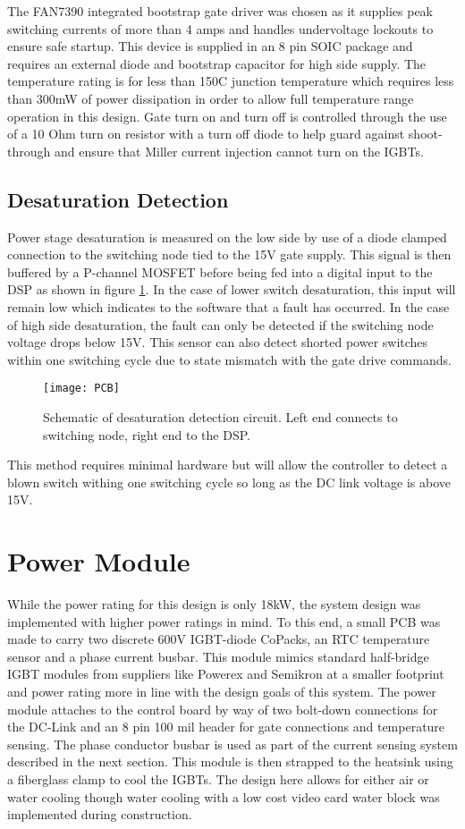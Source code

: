 The FAN7390 integrated bootstrap gate driver was chosen as it supplies peak
switching currents of more than 4 amps and handles undervoltage lockouts to
ensure safe startup.
This device is supplied in an 8 pin SOIC package and requires an external
diode and bootstrap capacitor for high side supply.
The temperature rating is for less than 150C junction temperature which
requires less than 300mW of power dissipation in order to allow full
temperature range operation in this design.
Gate turn on and turn off is controlled through the use of a 10 Ohm turn on
resistor with a turn off diode to help guard against shoot-through and ensure
that Miller current injection cannot turn on the IGBTs.

\subsection{Desaturation Detection}
Power stage desaturation is measured on the low side by use of a diode clamped
connection to the switching node tied to the 15V gate supply.
This signal is then buffered by a P-channel MOSFET before being fed into a
digital input to the DSP as shown in figure \ref{figDesat}.
In the case of lower switch desaturation, this input will remain low which
indicates to the software that a fault has occurred.
In the case of high side desaturation, the fault can only be detected if the
switching node voltage drops below 15V.
This sensor can also detect shorted power switches within one switching cycle
due to state mismatch with the gate drive commands.

\begin{figure}[htbp]
\centering
\label{figDesat}
\texttt{[image: PCB]}
\caption{Schematic of desaturation detection circuit. Left end connects to
switching node, right end to the DSP.}
\end{figure}

This method requires minimal hardware but will allow the controller to detect
a blown switch withing one switching cycle so long as the DC link voltage is
above 15V.


\section{Power Module}
While the power rating for this design is only 18kW, the system design was
implemented with higher power ratings in mind.
To this end, a small PCB was made to carry two discrete 600V IGBT-diode
CoPacks, an RTC temperature sensor and a phase current busbar.
This module mimics standard half-bridge IGBT modules from suppliers like
Powerex and Semikron at a smaller footprint and power rating more in line with
the design goals of this system.
The power module attaches to the control board by way of two bolt-down
connections for the DC-Link and an 8 pin 100 mil header for gate connections
and temperature sensing.
The phase conductor busbar is used as part of the current sensing system
described in the next section.
This module is then strapped to the heatsink using a fiberglass clamp to cool
the IGBTs.
The design here allows for either air or water cooling though water cooling
with a low cost video card water block was implemented during construction.

